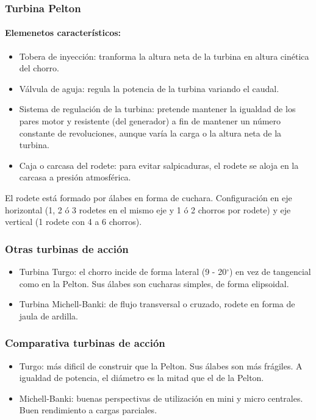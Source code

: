 \subsubsection{Turbina Pelton}
\paragraph{Elemenetos característicos:}
\begin{itemize}
    \item Tobera de inyección: tranforma la altura neta de la turbina en altura cinética del chorro.
    \item Válvula de aguja: regula la potencia de la turbina variando el caudal.
    \item Sistema de regulación de la turbina: pretende mantener la igualdad de los pares motor y resistente (del generador) a fin de mantener un número constante de revoluciones, aunque varía la carga o la altura neta de la turbina.
    \item Caja o carcasa del rodete: para evitar salpicaduras, el rodete se aloja en la carcasa a presión atmosférica.
\end{itemize}

El rodete está formado por álabes en forma de cuchara.
Configuración en eje horizontal (1, 2 ó 3 rodetes en el mismo eje y 1 ó 2 chorros por rodete) y eje vertical (1 rodete con 4 a 6 chorros).

\subsubsection{Otras turbinas de acción}
\begin{itemize}
    \item Turbina Turgo: el chorro incide de forma lateral (9 - 20$^\circ$) en vez de tangencial como en la Pelton. Sus álabes son cucharas simples, de forma elipsoidal.
    \item Turbina Michell-Banki: de flujo transversal o cruzado, rodete en forma de jaula de ardilla.
\end{itemize}

\subsubsection{Comparativa turbinas de acción}
\begin{itemize}
    \item Turgo: más dificil de construir que la Pelton. Sus álabes son más frágiles. A igualdad de potencia, el diámetro es la mitad que el de la Pelton.
    \item Michell-Banki: buenas perspectivas de utilización en mini y micro centrales. Buen rendimiento a cargas parciales.
\end{itemize}

